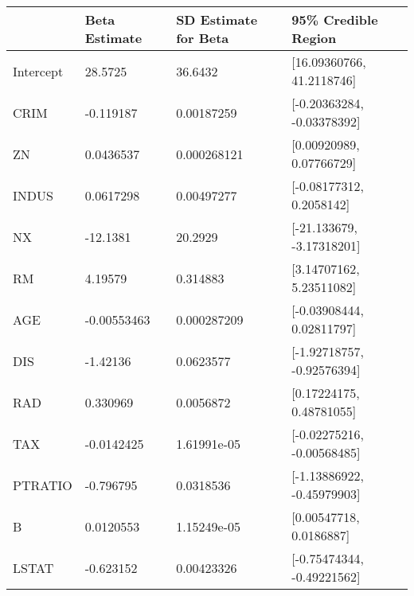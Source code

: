 \begin{tabular}{llll}
\hline
           & Beta Estimate   & SD Estimate for Beta   & 95\% Credible Region        \\
\hline
 Intercept & 28.5725         & 36.6432                & [16.09360766, 41.2118746]  \\
 CRIM      & -0.119187       & 0.00187259             & [-0.20363284, -0.03378392] \\
 ZN        & 0.0436537       & 0.000268121            & [0.00920989, 0.07766729]   \\
 INDUS     & 0.0617298       & 0.00497277             & [-0.08177312, 0.2058142]   \\
 NX        & -12.1381        & 20.2929                & [-21.133679, -3.17318201]  \\
 RM        & 4.19579         & 0.314883               & [3.14707162, 5.23511082]   \\
 AGE       & -0.00553463     & 0.000287209            & [-0.03908444, 0.02811797]  \\
 DIS       & -1.42136        & 0.0623577              & [-1.92718757, -0.92576394] \\
 RAD       & 0.330969        & 0.0056872              & [0.17224175, 0.48781055]   \\
 TAX       & -0.0142425      & 1.61991e-05            & [-0.02275216, -0.00568485] \\
 PTRATIO   & -0.796795       & 0.0318536              & [-1.13886922, -0.45979903] \\
 B         & 0.0120553       & 1.15249e-05            & [0.00547718, 0.0186887]    \\
 LSTAT     & -0.623152       & 0.00423326             & [-0.75474344, -0.49221562] \\
\hline
\end{tabular}